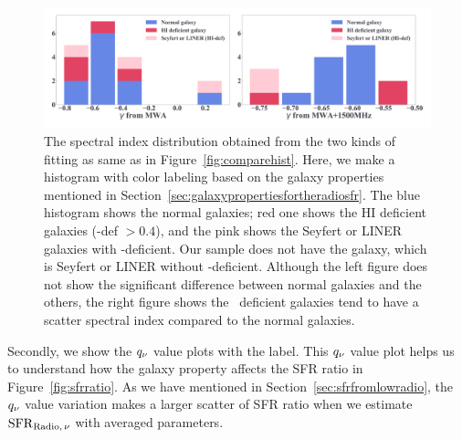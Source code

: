 \begin{figure}[htbp]
	\centering
	\includegraphics[width=\linewidth]{Chapter_6/Figures/Discuss_comparehist.pdf}
    \caption[Histograms of $\gamma$ from the fitting (labeled)]{\label{fig:comparehist_h1def}
        The spectral index distribution obtained from the two kinds of fitting as same as in Figure~\ref{fig:comparehist}.
        Here, we make a histogram with color labeling based on the galaxy properties mentioned in Section~\ref{sec:galaxypropertiesfortheradiosfr}.
        The blue histogram shows the normal galaxies; red one shows the HI deficient galaxies (\nh-def $> 0.4$), and the pink shows the Seyfert or LINER galaxies with \nh-deficient.
        Our sample does not have the galaxy, which is Seyfert or LINER without \nh-deficient.
        Although the left figure does not show the significant difference between normal galaxies and the others, the right figure shows the \nh~deficient galaxies tend to have a scatter spectral index compared to the normal galaxies.
    }
\end{figure}


Secondly, we show the $q_{\nu}$ value plots with the label.
This $q_{\nu}$ value plot helps us to understand how the galaxy property affects the SFR ratio in Figure~\ref{fig:sfrratio}.
As we have mentioned in Section~\ref{sec:sfrfromlowradio}, the $q_{\nu}$ value variation makes a larger scatter of SFR ratio when we estimate $\mathrm{SFR}_{\mathrm{Radio},\,\nu}$ with averaged parameters.

